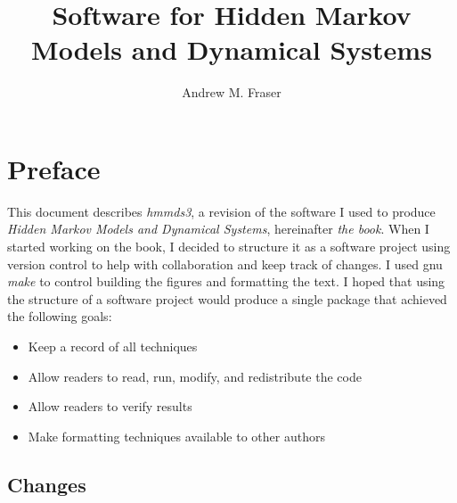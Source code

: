 \documentclass[prelim,showlabels]{book}
\author{Andrew M. Fraser}
\title{Software for Hidden Markov Models and Dynamical Systems}
\begin{document}
\frontmatter
\maketitle

\chapter{Preface}
\label{chap:preface}

This document describes \emph{hmmds3}, a revision of the software I
used to produce \emph{Hidden Markov Models and Dynamical Systems},
hereinafter \emph{the book}.  When I started working on the book, I
decided to structure it as a software project using version control to
help with collaboration and keep track of changes.  I used gnu
\emph{make} to control building the figures and formatting the text.
I hoped that using the structure of a software project would produce a
single package that achieved the following goals:
\begin{itemize}
\item Keep a record of all techniques
\item Allow readers to read, run, modify, and redistribute the code
\item Allow readers to verify results
\item Make formatting techniques available to other authors
\end{itemize}

\section*{Changes}
\label{sec:changes}
\end{document}
